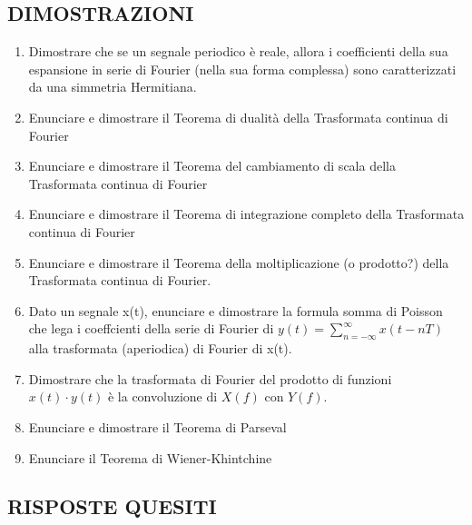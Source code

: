 \documentclass[
]{article}
\providecommand{\tightlist}{%
  \setlength{\itemsep}{0pt}\setlength{\parskip}{0pt}}
\begin{document}
\subsection{DIMOSTRAZIONI}\label{dimostrazioni}

\begin{enumerate}
\def\labelenumi{\arabic{enumi}.}
\item
  Dimostrare che se un segnale periodico è reale, allora i coefficienti
  della sua espansione in serie di Fourier (nella sua forma complessa)
  sono caratterizzati da una simmetria Hermitiana.
\item
  Enunciare e dimostrare il Teorema di dualità della Trasformata
  continua di Fourier
\item
  Enunciare e dimostrare il Teorema del cambiamento di scala della
  Trasformata continua di Fourier
\item
  Enunciare e dimostrare il Teorema di integrazione completo della
  Trasformata continua di Fourier
\item
  Enunciare e dimostrare il Teorema della moltiplicazione (o prodotto?)
  della Trasformata continua di Fourier.
\item
  Dato un segnale x(t), enunciare e dimostrare la formula somma di
  Poisson che lega i coeffcienti della serie di Fourier di
  \(\displaystyle y(t) = \sum_{n = -\infty}^{\infty} x(t - nT)\) alla
  trasformata (aperiodica) di Fourier di x(t).
\item
  Dimostrare che la trasformata di Fourier del prodotto di funzioni
  \(x(t) \cdot y(t)\) è la convoluzione di \(X(f)\) con \(Y (f)\).
\item
  Enunciare e dimostrare il Teorema di Parseval
\item
  Enunciare il Teorema di Wiener-Khintchine
\end{enumerate}

\newpage

\subsection{RISPOSTE QUESITI}\label{risposte-quesiti}
\end{document}
